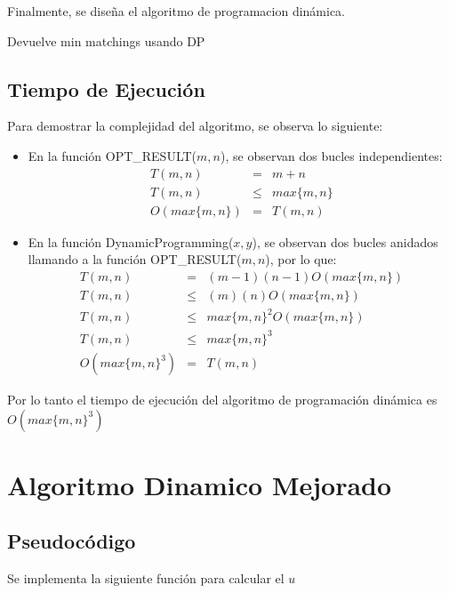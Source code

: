 \documentclass{article}
\begin{document}
Finalmente, se diseña el algoritmo de programacion dinámica. 

\begin{algorithm}
\caption{Devuelve min matchings usando DP}
\begin{algorithmic}[1]
         \EndFor
     \EndFor
    \State{\Return{Matrix[x][y]}
\end{algorithmic}
\end{algorithm}
\newpage
\subsection{Tiempo de Ejecución}
Para demostrar la complejidad del algoritmo, se observa lo siguiente:
\begin{itemize}
    \item En la función OPT\_RESULT($m, n$), se observan dos bucles independientes:
    \begin{eqnarray*}
    T(m,n) &=& m + n \\
    T(m,n) &\leq& max\{m,n\} \\
    O(max\{m, n\}) &=& T(m, n)
    \end{eqnarray*}
    \item En la función DynamicProgramming($x,y$), se observan dos bucles anidados llamando a la función OPT\_RESULT($m, n$), por lo que: \begin{eqnarray*}
    T(m,n) &=& (m-1)(n-1)O(max\{m,n\}) \\
    T(m,n) &\leq& (m)(n)O(max\{m,n\}) \\
    T(m,n) &\leq& max\{m,n\}^2O(max\{m,n\}) \\
    T(m,n) &\leq& max\{m,n\}^3 \\
    O(max\{m, n\}^3) &=& T(m, n)
    \end{eqnarray*}
\end{itemize}
Por lo tanto el tiempo de ejecución del algoritmo de programación dinámica es $O(max\{m,n\}^3)$
 
\section{Algoritmo Dinamico Mejorado}
\subsection{Pseudocódigo}
Se implementa la siguiente función para calcular el $u$
\end{document}
